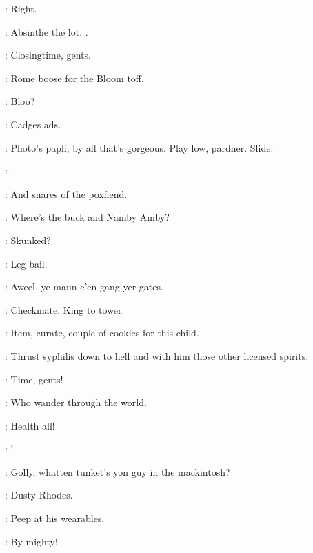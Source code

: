 \documentclass[12pt]{article}
\begin{document}
\Br: Right.


\SD: Absinthe the lot.
.

\Br: Closingtime, gents.


\SD: Rome boose for the Bloom toff.


\Ba: Bloo?

\Dx: Cadges ads.

\Ba: Photo's papli, by all that's gorgeous.
Play low, pardner.
Slide.

\Mu: .


\SD: And snares of the poxfiend.

\BL: Where's the buck and Namby Amby?

\SD: Skunked?

\Ln: Leg bail.

\Cr: Aweel, ye maun e'en gang yer gates.

\SD: Checkmate. King to tower.




\PC: Item, curate, couple of cookies for this child.



\SD: Thrust syphilis down to hell and with him those other licensed spirits.

\Br: Time, gents!

\SD: Who wander through the world.

\PC: Health all!

\Dx: !


\Cr: Golly, whatten tunket's yon guy in the mackintosh?

\Ln: Dusty Rhodes.

\Ly: Peep at his wearables.

\Cr: By mighty!
\end{document}
